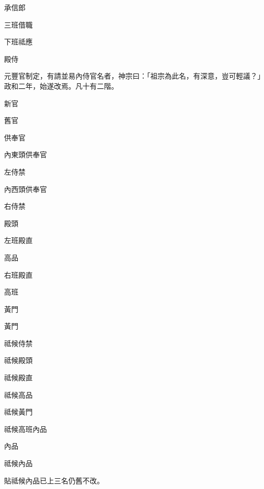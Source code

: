 \begin{pinyinscope}
 承信郎



 三班借職



 下班祗應



 殿侍



 元豐官制定，有請並易內侍官名者，神宗曰：「祖宗為此名，有深意，豈可輕議？」政和二年，始遂改焉。凡十有二階。



 新官



 舊官



 供奉官



 內東頭供奉官



 左侍禁



 內西頭供奉官



 右侍禁



 殿頭



 左班殿直



 高品



 右班殿直



 高班



 黃門



 黃門



 祗候侍禁



 祗候殿頭



 祗候殿直



 祗候高品



 祗候黃門



 祗候高班內品



 內品



 祗候內品



 貼祗候內品已上三名仍舊不改。




\end{pinyinscope}
